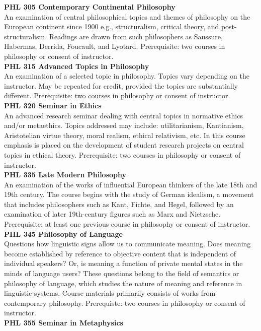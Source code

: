 \documentclass[
  letterpaper,
]{scrbook}
\begin{document}
\textbf{PHL 305 Contemporary Continental Philosophy}\\
An examination of central philosophical topics and themes of philosophy
on the European continent since 1900 e.g., structuralism, critical
theory, and post-structuralism. Readings are drawn from such
philosophers as Saussure, Habermas, Derrida, Foucault, and Lyotard.
Prerequisite: two courses in philosophy or consent of instructor.\\
\textbf{PHL 315 Advanced Topics in Philosophy}\\
An examination of a selected topic in philosophy. Topics vary depending
on the instructor. May be repeated for credit, provided the topics are
substantially different. Prerequisite: two courses in philosophy or
consent of instructor.\\
\textbf{PHL 320 Seminar in Ethics}\\
An advanced research seminar dealing with central topics in normative
ethics and/or metaethics. Topics addressed may include: utilitarianism,
Kantianism, Aristotelian virtue theory, moral realism, ethical
relativism, etc. In this course emphasis is placed on the development of
student research projects on central topics in ethical theory.
Prerequisite: two courses in philosophy or consent of instructor.\\
\textbf{PHL 335 Late Modern Philosophy}\\
An examination of the works of influential European thinkers of the late
18th and 19th century. The course begins with the study of German
idealism, a movement that includes philosophers such as Kant, Fichte,
and Hegel, followed by an examination of later 19th-century figures such
as Marx and Nietzsche. Prerequisite: at least one previous course in
philosophy or consent of instructor.\\
\textbf{PHL 345 Philosophy of Language}\\
Questions how linguistic signs allow us to communicate meaning. Does
meaning become established by reference to objective content that is
independent of individual speakers? Or, is meaning a function of private
mental states in the minds of language users? These questions belong to
the field of semantics or philosophy of language, which studies the
nature of meaning and reference in linguistic systems. Course materials
primarily consists of works from contemporary philosophy. Prerequiste:
two courses in philosophy or consent of instructor.\\
\textbf{PHL 355 Seminar in Metaphysics}\\
\end{document}
